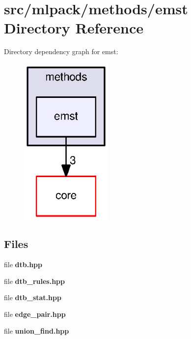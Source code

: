 \section{src/mlpack/methods/emst Directory Reference}
\label{dir_88d49b0062d70fa894a1612206b4da93}
Directory dependency graph for emst\+:
\nopagebreak
\begin{figure}[H]
\begin{center}
\leavevmode
\includegraphics[width=130pt]{dir_88d49b0062d70fa894a1612206b4da93_dep}
\end{center}
\end{figure}
\subsection*{Files}
\begin{DoxyCompactItemize}
\item 
file {\bf dtb.\+hpp}
\item 
file {\bf dtb\+\_\+rules.\+hpp}
\item 
file {\bf dtb\+\_\+stat.\+hpp}
\item 
file {\bf edge\+\_\+pair.\+hpp}
\item 
file {\bf union\+\_\+find.\+hpp}
\end{DoxyCompactItemize}

